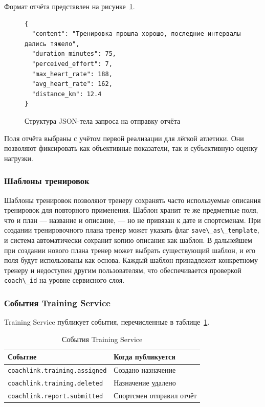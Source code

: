 Формат отчёта представлен на рисунке~\ref{src:report-format}.

\begin{figure}
\begin{lstlisting}
{
  "content": "Тренировка прошла хорошо, последние интервалы дались тяжело",
  "duration_minutes": 75,
  "perceived_effort": 7,
  "max_heart_rate": 188,
  "avg_heart_rate": 162,
  "distance_km": 12.4
}
\end{lstlisting}
\caption{Структура JSON-тела запроса на отправку отчёта}
\label{src:report-format}
\end{figure}

Поля отчёта выбраны с учётом первой реализации для лёгкой атлетики. Они позволяют фиксировать как объективные показатели, так и субъективную оценку нагрузки.

\subsubsection{Шаблоны тренировок}

Шаблоны тренировок позволяют тренеру сохранять часто используемые описания тренировок для повторного применения. Шаблон хранит те же предметные поля, что и план --- название и описание, --- но не привязан к дате и спортсменам. При создании тренировочного плана тренер может указать флаг \passthrough{\lstinline!save\_as\_template!}, и система автоматически сохранит копию описания как шаблон. В дальнейшем при создании нового плана тренер может выбрать существующий шаблон, и его поля будут использованы как основа. Каждый шаблон принадлежит конкретному тренеру и недоступен другим пользователям, что обеспечивается проверкой \passthrough{\lstinline!coach\_id!} на уровне сервисного слоя.

\subsubsection{События Training Service}

Training Service публикует события, перечисленные в таблице~\ref{tab:training-service-events}.

\begin{longtable}{|>{\raggedright\arraybackslash}p{}|>{\raggedright\arraybackslash}p{}|}
\caption{События Training Service}\label{tab:training-service-events}\\
\hline
Событие & Когда публикуется \\
\hline
\endhead
\hline
\endlastfoot
\passthrough{\lstinline!coachlink.training.assigned!} & Создано назначение \\ \hline
\passthrough{\lstinline!coachlink.training.deleted!} & Назначение удалено \\ \hline
\passthrough{\lstinline!coachlink.report.submitted!} & Спортсмен отправил отчёт \\ \hline
\end{longtable}

